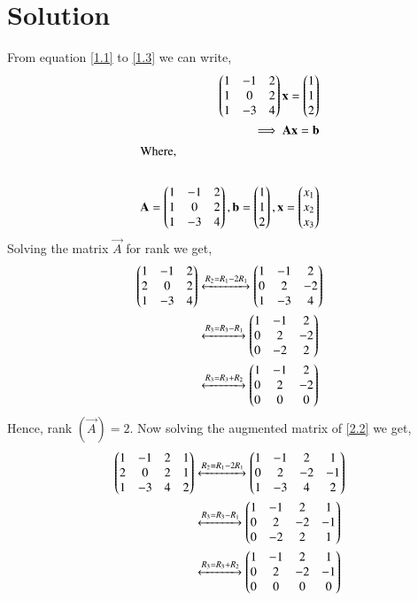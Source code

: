 \documentclass[journal,12pt,twocolumn]{IEEEtran}
\begin{document}
\section{Solution}
From equation \eqref{1.1} to \eqref{1.3} we can write,
\begin{align}
\begin{pmatrix}1 & -1 & 2 \\ 1 & 0 & 2 \\ 1 & -3 & 4\end{pmatrix}\mathbf{x}= \begin{pmatrix}1 \\ 1 \\ 2\end{pmatrix}\\
\implies \mathbf{A}\mathbf{x} = \mathbf{b}  \label{2.2}\\
\intertext{Where,}\\
\mathbf{A} = \begin{pmatrix}1 & -1 & 2 \\ 1 & 0 & 2 \\ 1 & -3 & 4\end{pmatrix}, \mathbf{b}= \begin{pmatrix}1 \\ 1 \\ 2\end{pmatrix}, \mathbf{x} = \begin{pmatrix}x_1 \\ x_2 \\ x_3\end{pmatrix} \label{2.4}
\end{align}
Solving the  matrix $\vec{A}$ for rank  we get,
\begin{align}
\begin{pmatrix}1&-1& 2\\ 2& 0 & 2 \\ 1 & -3 & 4\end{pmatrix} &\xleftrightarrow{R_2=R_1 - 2R_1}\begin{pmatrix}1&-1&2 \\ 0 &2 & -2 \\ 1 &-3 & 4\end{pmatrix}\\
&\xleftrightarrow{R_3=R_3 -R_1}\begin{pmatrix}1 &-1&2 \\0 &2 &-2 \\ 0 & -2 & 2\end{pmatrix}\\
&\xleftrightarrow{R_3=R_3 + R_2}\begin{pmatrix}1 &-1&2 \\0 &2 &-2 \\ 0 & 0 & 0\end{pmatrix}
\end{align}
Hence, rank $\left(  \vec{A}  \right) = 2. $
Now solving the augmented matrix of \eqref{2.2} we get,
\begin{align}
\begin{pmatrix}1&-1& 2 & 1 \\ 2& 0 & 2 & 1 \\ 1 & -3 & 4 & 2 \end{pmatrix} &\xleftrightarrow{R_2=R_1 - 2R_1}\begin{pmatrix}1&-1&2 & 1  \\ 0 &2 & -2 & -1 \\ 1 &-3 & 4 & 2\end{pmatrix}\\
&\xleftrightarrow{R_3=R_3 -R_1}\begin{pmatrix}1 &-1&2 & 1\\0 &2 &-2 &-1 \\ 0 & -2 & 2 & 1\end{pmatrix} \\
&\xleftrightarrow{R_3=R_3 + R_2}\begin{pmatrix}1 &-1&2 & 1 \\0 &2 &-2 & -1 \\ 0 & 0 & 0 & 0\end{pmatrix}
\end{align}
\end{document}
